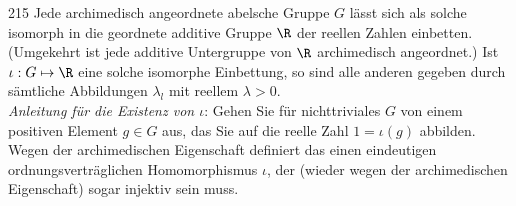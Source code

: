 \begin{algebraUE}{215}
Jede archimedisch angeordnete abelsche Gruppe $G$ lässt sich als solche isomorph
in die geordnete additive Gruppe $\R$ der reellen Zahlen einbetten. (Umgekehrt
ist jede additive Untergruppe von $\R$ archimedisch angeordnet.)
Ist $\iota: G \mapsto \R$ eine solche isomorphe Einbettung, so sind alle anderen
gegeben durch sämtliche Abbildungen $\lambda_l$ mit reellem $\lambda > 0$. \\
\textit{Anleitung für die Existenz von $\iota$}: Gehen Sie für nichttriviales
$G$ von einem positiven Element $g \in G$ aus, das Sie auf die reelle Zahl
$1 = \iota(g)$ abbilden. Wegen der archimedischen Eigenschaft definiert das
einen eindeutigen ordnungsverträglichen Homomorphismus $\iota$, der
(wieder wegen der archimedischen Eigenschaft) sogar injektiv sein muss.
\end{algebraUE}
